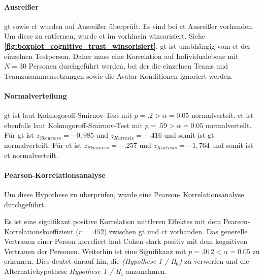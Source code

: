 \documentclass[a4paper,11pt]{article}%
\renewcommand{\\}{\vspace*{0.5\baselineskip} \newline}
\begin{document}
\paragraph{Ausreißer}
\ac{gt} sowie \ac{ct} wurden auf Ausreißer überprüft. 
Es sind bei \ac{ct} Ausreißer vorhanden. Um diese zu entfernen, wurde \ac{ct} im vorhinein winsorisiert. Siehe \textbf{\autoref{fig:boxplot_cognitive_trust_winsorisiert}}. 
\ac{gt} ist unabhängig vom \ac{ct} der einzelnen Testperson. Daher muss eine Korrelation auf Individualebene mit $N=30$ Personen durchgeführt werden, bei der die einzelnen Teams und Teamzusammensetzungen sowie die Avatar Konditionen ignoriert werden. 

\paragraph{Normalverteilung}
\ac{gt} ist laut Kolmogoroff-Smirnov-Test mit $p = .2 > \alpha = 0.05$ normalverteit. 
\ac{ct} ist ebenfalls laut Kolmogoroff-Smirnov-Test mit $p = .59 > \alpha = 0.05$ normalverteilt. 
Für \ac{gt} ist $ z_{Skewness} = -0,985 $ und $z_{Kurtosis} = -.416$ und somit ist \ac{gt} normalverteilt.
Für \ac{ct} ist $ z_{Skewness} = -.257 $ und $z_{Kurtosis} = -1,764$ und somit ist \ac{ct} normalverteilt.


\paragraph{Pearson-Korrelationsanalyse}
Um diese Hypothese zu überprüfen, wurde eine Pearson- Korrelationsanalyse durchgeführt. 

	
Es ist eine signifikant positive Korrelation mittleren Effektes mit dem Pearson- Korrelationskoeffizient ($r = .452$) zwischen \ac{gt} und \ac{ct} vorhanden. 
Das generelle Vertrauen einer Person korreliert  laut Cohen \cite{cohen2013statistical} stark positiv mit dem kognitiven Vertrauen der Personen.
Weiterhin ist eine Signifikanz mit $p = .012 < \alpha = 0.05$ zu erkennen. Dies deutet darauf hin, die \textit{(Hypothese 1 / H$_{0}$)} zu verwerfen und die Alternativhypothese \textit{Hypothese 1 / H$_{1}$} anzunehmen.
\end{document}
